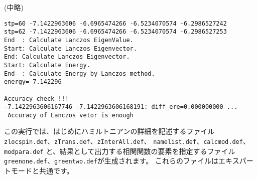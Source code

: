 (中略)
\begin{verbatim}
stp=60 -7.1422963606 -6.6965474266 -6.5234070574 -6.2986527242 
stp=62 -7.1422963606 -6.6965474266 -6.5234070574 -6.2986527253 
End  : Calculate Lanczos EigenValue.
Start: Calculate Lanczos Eigenvector.
End: Calculate Lanczos Eigenvector.
Start: Calculate Energy.
End  : Calculate Energy by Lanczos method.
energy=-7.142296 

Accuracy check !!!
-7.1422963606167746 -7.1422963606168191: diff_ere=0.000000000 ...
 Accuracy of Lanczos vetor is enough

\end{verbatim}

この実行では、はじめにハミルトニアンの詳細を記述するファイル
\verb|zlocspin.def|、\verb|zTrans.def|、\verb|zInterAll.def|、
\verb|namelist.def|、\verb|calcmod.def|、\verb|modpara.def|
と、結果として出力する相関関数の要素を指定するファイル
\verb|greenone.def|、\verb|greentwo.def|が生成されます。
これらのファイルはエキスパートモードと共通です。

